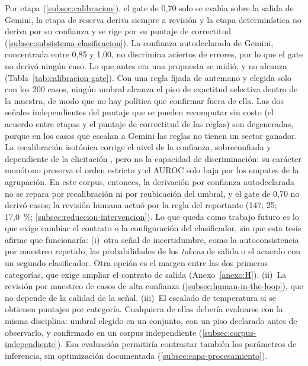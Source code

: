 Por etapa (\autoref{subsec:calibracion}), el gate de 0,70 solo se evalúa sobre la salida de Gemini, la etapa de reserva deriva siempre a revisión y la etapa determinística no deriva por su confianza y se rige por su puntaje de correctitud (\autoref{subsec:subsistema-clasificacion}). La confianza autodeclarada de Gemini, concentrada entre 0,85 y 1,00, no discrimina aciertos de errores, por lo que el gate no derivó ningún caso. Lo que antes era una propuesta se midió, y no alcanza (Tabla~\ref{tab:calibracion-gate}). Con una regla fijada de antemano y elegida solo con los 200 casos, ningún umbral alcanza el piso de exactitud selectiva dentro de la muestra, de modo que no hay política que confirmar fuera de ella. Las dos señales independientes del puntaje que se pueden recomputar sin costo (el acuerdo entre etapas y el puntaje de correctitud de las reglas) son degeneradas, porque en los casos que escalan a Gemini las reglas no tienen un sector ganador. La recalibración isotónica \parencite{NiculescuMizil2005_probabilities} corrige el nivel de la confianza, sobreconfiada y dependiente de la elicitación \parencite{Xiong2024_confidence_elicitation, Tian2023_verbalized_confidence}, pero no la capacidad de discriminación: su carácter monótono preserva el orden estricto y el AUROC solo baja por los empates de la agrupación. En este corpus, entonces, la derivación por confianza autodeclarada no se repara por recalibración ni por reubicación del umbral, y el gate de 0,70 no derivó casos; la revisión humana actuó por la regla del reportante (147; 25; 17,0~\%; \autoref{subsec:reduccion-intervencion}). Lo que queda como trabajo futuro es lo que exige cambiar el contrato o la configuración del clasificador, sin que esta tesis afirme que funcionaría: (i)~otra señal de incertidumbre, como la autoconsistencia por muestreo repetido, las probabilidades de los \emph{tokens} de salida o el acuerdo con un segundo clasificador. Otra opción es el margen entre las dos primeras categorías, que exige ampliar el contrato de salida (Anexo~\ref{anexo:H}). (ii)~La revisión por muestreo de casos de alta confianza (\autoref{subsec:human-in-the-loop}), que no depende de la calidad de la señal. (iii)~El escalado de temperatura \parencite{Guo2017_calibration} si se obtienen puntajes por categoría. Cualquiera de ellas debería evaluarse con la misma disciplina: umbral elegido en un conjunto, con un piso declarado antes de observarlo, y confirmado en un corpus independiente (\autoref{subsec:corpus-independiente}). Esa evaluación permitiría contrastar también los parámetros de inferencia, sin optimización documentada (\autoref{subsec:capa-procesamiento}).

